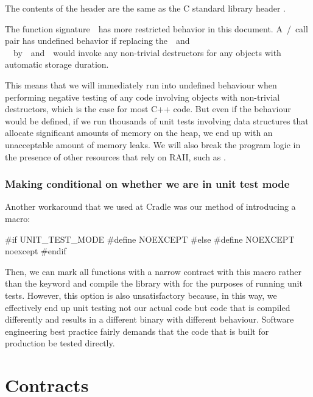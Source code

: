 \begin{adjustwidth}{0.5cm}{0.5cm}
The contents of the header  are the same as the C standard library header .

The function signature  has more restricted behavior in this document. A / call pair has undefined behavior if replacing the  and \\  by  and  would invoke any non-trivial destructors for any objects with automatic storage duration.
\end{adjustwidth}

This means that we will immediately run into undefined behaviour when performing negative testing of any code involving objects with non-trivial destructors, which is the case for most C++ code. But even if the behaviour would be defined, if we run thousands of unit tests involving data structures that allocate significant amounts of memory on the heap, we end up with an unacceptable amount of memory leaks. We will also break the program logic in the presence of other resources that rely on RAII, such as .

\subsubsection{Making  conditional on whether we are in unit test mode}

Another workaround that we used at Cradle was our method of introducing a macro:
\begin{codeblock}
#if UNIT_TEST_MODE
  #define NOEXCEPT 
#else
  #define NOEXCEPT noexcept
#endif
\end{codeblock}
Then, we can mark all functions with a narrow contract with this  macro rather than the  keyword and compile the library with  for the purposes of running unit tests. However, this option is also unsatisfactory because, in this way, we effectively end up unit testing not our actual code but code that is compiled differently and results in a different binary with different behaviour. Software engineering best practice fairly demands that the code that is built for production be tested directly.

\section{Contracts}
\label{sec:contracts}

